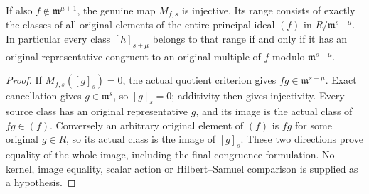 \begin{theorem}
\label{hir:actual-principal-multiplication-jet-injective-image}
\leanok
{}
If also $f\notin\mathfrak m^{\mu+1}$, the genuine map $M_{f,s}$ is
injective. Its range consists of exactly the classes of all original
elements of the entire principal ideal $(f)$ in
$R/\mathfrak m^{s+\mu}$. In particular every class $[h]_{s+\mu}$ belongs
to that range if and only if it has an original representative congruent
to an original multiple of $f$ modulo $\mathfrak m^{s+\mu}$.
\end{theorem}
\begin{proof}
If $M_{f,s}([g]_s)=0$, the actual quotient criterion gives
$fg\in\mathfrak m^{s+\mu}$. Exact cancellation gives
$g\in\mathfrak m^s$, so $[g]_s=0$; additivity then gives injectivity.
Every source class has an original representative $g$, and its image is
the actual class of $fg\in(f)$. Conversely an arbitrary original element
of $(f)$ is $fg$ for some original $g\in R$, so its actual class is the
image of $[g]_s$. These two directions prove equality of the whole image,
including the final congruence formulation. No kernel, image equality,
scalar action or Hilbert--Samuel comparison is supplied as a hypothesis.
\end{proof}
